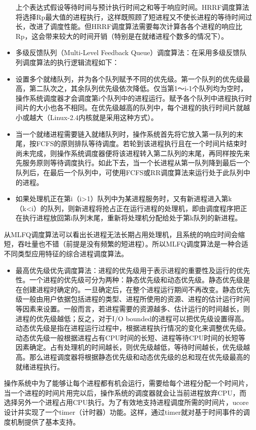 \begin{itemize}
  上个表达式假设等待时间与预计执行时间之和等于响应时间。HRRF调度算法将选择Rp最大值的进程执行，这样既照顾了短进程又不使长进程的等待时间过长，改进了调度性能。但HRRF调度算法需要每次计算各各个进程的响应比Rp，这会带来较大的时间开销（特别是在就绪进程个数多的情况下）。
\item
  多级反馈队列（Multi-Level Feedback
  Queue）调度算法：在采用多级反馈队列调度算法的执行逻辑流程如下：
\item
  设置多个就绪队列，并为各个队列赋予不同的优先级。第一个队列的优先级最高，第二队次之，其余队列优先级依次降低。仅当第1～i-1个队列均为空时，操作系统调度器才会调度第i个队列中的进程运行。赋予各个队列中进程执行时间片的大小也各不相同。在优先级越高的队列中，每个进程的执行时间片就越小或越大（Linux-2.4内核就是采用这种方式）。
\item
  当一个就绪进程需要链入就绪队列时，操作系统首先将它放入第一队列的末尾，按FCFS的原则排队等待调度。若轮到该进程执行且在一个时间片结束时尚未完成，则操作系统调度器便将该进程转入第二队列的末尾，再同样按先来先服务原则等待调度执行。如此下去，当一个长进程从第一队列降到最后一个队列后，在最后一个队列中，可使用FCFS或RR调度算法来运行处于此队列中的进程。
\item
  如果处理机正在第i（i\textgreater{}1）队列中为某进程服务时，又有新进程进入第k（k\textless{}i）的队列，则新进程将抢占正在运行进程的处理机，即由调度程序把正在执行进程放回第i队列末尾，重新将处理机分配给处于第k队列的新进程。
\end{itemize}

从MLFQ调度算法可以看出长进程无法长期占用处理机，且系统的响应时间会缩短，吞吐量也不错（前提是没有频繁的短进程）。所以MLFQ调度算法是一种合适不同类型应用特征的综合进程调度算法。

\begin{itemize}
\tightlist
\item
  最高优先级优先调度算法：进程的优先级用于表示进程的重要性及运行的优先性。一个进程的优先级可分为两种：静态优先级和动态优先级。静态优先级是在创建进程时确定的。一旦确定后，在整个进程运行期间不再改变。静态优先级一般由用户依据包括进程的类型、进程所使用的资源、进程的估计运行时间等因素来设置。一般而言，若进程需要的资源越多、估计运行的时间越长，则进程的优先级越低；反之，对于I/O
  bounded的进程可以把优先级设置得高。动态优先级是指在进程运行过程中，根据进程执行情况的变化来调整优先级。动态优先级一般根据进程占有CPU时间的长短、进程等待CPU时间的长短等因素确定。占有处理机的时间越长，则优先级越低，等待时间越长，优先级越高。那么进程调度器将根据静态优先级和动态优先级的总和现在优先级最高的就绪进程执行。
\end{itemize}

操作系统中为了能够让每个进程都有机会运行，需要给每个进程分配一个时间片，当一个进程的时间片用完以后，操作系统的调度器就会让当前进程放弃CPU，而选择另外一个进程占用CPU执行。为了有效地支持进程调度所需的时间片，ucore设计并实现了一个timer（计时器）功能。这样，通过timer就对基于时间事件的调度机制提供了基本支持。
